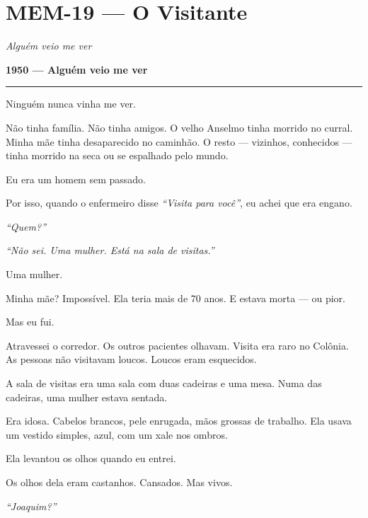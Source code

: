 \section*{\textbf{MEM-19} --- O Visitante}

\noindent \textit{Alguém veio me ver}

\noindent \textbf{1950 --- Alguém veio me ver}

\vspace{0.5em}\noindent\rule{\textwidth}{0.5pt}\vspace{0.5em}

\noindent Ninguém nunca vinha me ver.

\noindent Não tinha família. Não tinha amigos. O velho Anselmo tinha morrido no curral. Minha mãe tinha desaparecido no caminhão. O resto --- vizinhos, conhecidos --- tinha morrido na seca ou se espalhado pelo mundo.

\noindent Eu era um homem sem passado.

\noindent Por isso, quando o enfermeiro disse \textit{\textquotedblleft{}Visita para você\textquotedblright{}}, eu achei que era engano.

\noindent \textit{\textquotedblleft{}Quem?\textquotedblright{}}

\noindent \textit{\textquotedblleft{}Não sei. Uma mulher. Está na sala de visitas.\textquotedblright{}}

\noindent Uma mulher.

\noindent Minha mãe? Impossível. Ela teria mais de 70 anos. E estava morta --- ou pior.

\noindent Mas eu fui.

\noindent Atravessei o corredor. Os outros pacientes olhavam. Visita era raro no Colônia. As pessoas não visitavam loucos. Loucos eram esquecidos.

\noindent A sala de visitas era uma sala com duas cadeiras e uma mesa. Numa das cadeiras, uma mulher estava sentada.

\noindent Era idosa. Cabelos brancos, pele enrugada, mãos grossas de trabalho. Ela usava um vestido simples, azul, com um xale nos ombros.

\noindent Ela levantou os olhos quando eu entrei.

\noindent Os olhos dela eram castanhos. Cansados. Mas vivos.

\noindent \textit{\textquotedblleft{}Joaquim?\textquotedblright{}}

